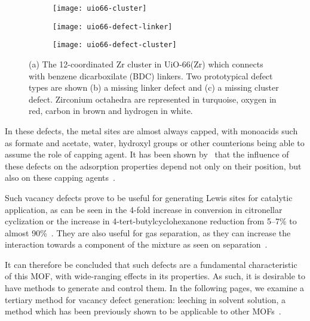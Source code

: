 \begin{figure}[htb]
	\centering

	\begin{subfigure}{0.3\linewidth}
		\parbox[c]{0.15\linewidth}{\caption{}%
			\label{defects:fgr:uio66-cluster}}%
		\parbox[b]{0.85\linewidth}{%
			\texttt{[image: uio66-cluster]}%
		}%
	\end{subfigure}
	\begin{subfigure}{0.3\linewidth}
		\parbox[c]{0.15\linewidth}{\caption{}%
			\label{defects:fgr:uio66-defect-linker}}%
		\parbox[b]{0.85\linewidth}{%
			\texttt{[image: uio66-defect-linker]}%
		}%
	\end{subfigure}
	\begin{subfigure}{0.3\linewidth}
		\parbox[c]{0.15\linewidth}{\caption{}%
			\label{defects:fgr:uio66-defect-cluster}}%
		\parbox[b]{0.85\linewidth}{%
			\texttt{[image: uio66-defect-cluster]}%
		}%
	\end{subfigure}

	\caption{(a) The 12-coordinated Zr cluster in UiO-66(Zr)
		which connects with benzene dicarboxilate (BDC) linkers.
		Two prototypical defect types are shown (b) a missing
		linker defect and (c) a missing cluster defect. Zirconium
		octahedra are represented in turquoise, oxygen in red,
		carbon in brown and hydrogen in white.}%
	\label{defects:fgr:uio66}

\end{figure}

In these defects, the metal sites are almost always capped,
with monoacids such as formate and acetate, water, hydroxyl groups
or other counterions being able
to assume the role of capping agent. It has been shown
by~\citeauthor{thorntonDefectsMetalOrganic2016} that the influence
of these defects on the adsorption properties depend not only
on their position, but also on these capping
agents~\cite{thorntonDefectsMetalOrganic2016}. 

Such vacancy defects prove to be useful for generating Lewis
sites for catalytic application, as can be seen in the 
4-fold increase in conversion in citronellar cyclization or
the increase in 4-tert-butylcyclohexanone reduction from 
5--7\% to almost 90\%~\cite{vermoorteleSynthesisModulationTool2013}.
They are also useful for gas separation, as they can increase the 
interaction towards a component of the mixture as seen 
on  separation~\cite{thorntonDefectsMetalOrganic2016}.

It can therefore be concluded that such defects are a fundamental 
characteristic of this MOF, with wide-ranging effects in its 
properties.
As such, it is desirable to have methods to generate and control
them. In the following pages, we examine a tertiary method 
for vacancy defect generation: leeching in solvent
solution, a method which has been previously shown to be applicable 
to other MOFs~\cite{tuOrderedVacanciesTheir2014}.

